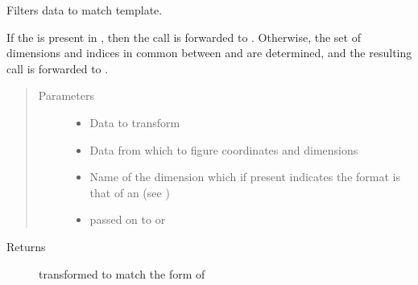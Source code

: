 \documentclass[letterpaper,10pt,english]{sphinxmanual}
\begin{document}
\begin{fulllineitems}
\label{\detokenize{api:muse.utilities.filter_with_template}}
Filters data to match template.

If the  is present in , then the call is
forwarded to . Otherwise, the set of dimensions and indices
in common between  and  are determined, and the resulting
call is forwarded to .
\begin{quote}\begin{description}
\item[{Parameters}] \leavevmode\begin{itemize}
\item {} 
 \textendash{} Data to transform

\item {} 
 \textendash{} Data from which to figure coordinates and dimensions

\item {} 
 \textendash{} Name of the dimension which if present indicates the
format is that of an  (see )

\item {} 
 \textendash{} passed on to  or 

\end{itemize}

\end{description}\end{quote}
\begin{description}
\item[{Returns}] \leavevmode
{} transformed to match the form of 

\end{description}

\end{fulllineitems}
\end{document}
